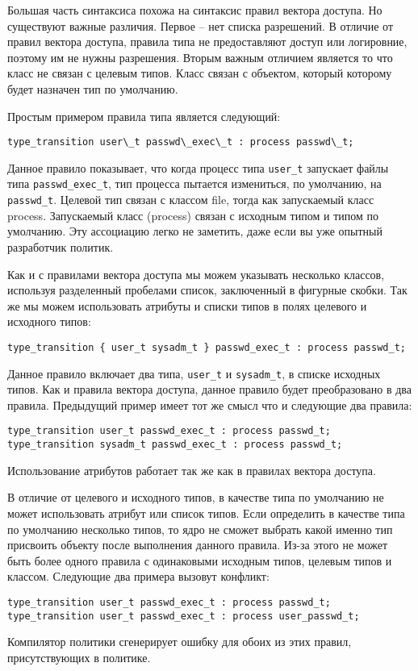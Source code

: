 \documentclass{./../class/UIR}
\begin{document}
    Большая часть синтаксиса похожа на синтаксис правил вектора доступа. Но
    существуют важные различия. Первое – нет списка разрешений. В отличие от
    правил вектора доступа, правила типа не предоставляют доступ или логировние,
    поэтому им не нужны разрешения. Вторым важным отличием является то что класс
    не связан с целевым типов. Класс связан с объектом, который которому будет
    назначен тип по умолчанию.

    Простым примером правила типа является следующий:
\begin{verbatim}
type_transition user\_t passwd\_exec\_t : process passwd\_t;
\end{verbatim}
    Данное правило показывает, что когда процесс типа \verb"user_t" запускает
    файлы типа \verb"passwd_exec_t", тип процесса пытается измениться, по
    умолчанию, на \verb"passwd_t". Целевой тип связан с классом file, тогда как
    запускаемый класс process. Запускаемый класс (process) связан с исходным типом и типом по
    умолчанию. Эту ассоциацию легко не заметить, даже если вы уже опытный
    разработчик политик.

    Как и с правилами вектора доступа мы можем указывать несколько классов,
    используя разделенный пробелами список, заключенный в фигурные скобки. Так
    же мы можем использовать атрибуты и списки типов в полях целевого и
    исходного типов:
\begin{verbatim}
type_transition { user_t sysadm_t } passwd_exec_t : process passwd_t;
\end{verbatim}
    Данное правило включает два типа, \verb"user_t" и \verb"sysadm_t", в списке
    исходных типов. Как и правила вектора доступа, данное правило будет
    преобразовано в два правила. Предыдущий пример имеет тот же смысл что и
    следующие два правила:
\begin{verbatim}
type_transition user_t passwd_exec_t : process passwd_t;
type_transition sysadm_t passwd_exec_t : process passwd_t;
\end{verbatim}
    Использование атрибутов работает так же как в правилах вектора доступа.

    В отличие от целевого и исходного типов, в качестве типа по умолчанию не
    может использовать атрибут или список типов. Если определить в качестве типа
    по умолчанию несколько типов, то ядро не сможет выбрать какой именно тип
    присвоить объекту после выполнения данного правила. Из-за этого не может
    быть более одного правила с одинаковыми исходным типов, целевым типов и
    классом. Следующие два примера вызовут конфликт:
\begin{verbatim}
type_transition user_t passwd_exec_t : process passwd_t;
type_transition user_t passwd_exec_t : process user_passwd_t;
\end{verbatim}
    Компилятор политики сгенерирует ошибку для обоих из этих правил,
    присутствующих в политике.
\end{document}
